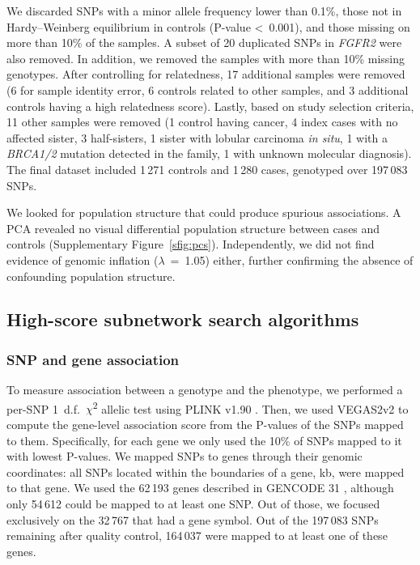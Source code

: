 \documentclass[twocolumn, 11pt]{article}
\begin{document}
We discarded SNPs with a minor allele frequency lower than 0.1\%, those not in Hardy--Weinberg equilibrium in controls (P-value \textless~0.001), and those missing on more than 10\% of the samples. A subset of 20 duplicated SNPs in \emph{FGFR2} were also removed. In addition, we removed the samples with more than 10\% missing genotypes. After controlling for relatedness, 17 additional samples were removed (6 for sample identity error, 6 controls related to other samples, and 3 additional controls having a high relatedness score). Lastly, based on study selection criteria, 11 other samples were removed (1 control having cancer, 4 index cases with no affected sister, 3 half-sisters, 1 sister with lobular carcinoma \emph{in situ}, 1 with a \emph{BRCA1/2} mutation detected in the family, 1 with unknown molecular diagnosis). The final dataset included 1\,271 controls and 1\,280 cases, genotyped over 197\,083 SNPs. 

We looked for population structure that could produce spurious associations. A PCA revealed no visual differential population structure between cases and controls (Supplementary Figure~\ref{sfig:pcs}). Independently, we did not find evidence of genomic inflation (\(\lambda\)~=~1.05) either, further confirming the absence of confounding population structure.

\subsection{High-score subnetwork search algorithms}
\subsubsection{SNP and gene association}
\label{methods:node_score}
To measure association between a genotype and the phenotype, we performed a per-SNP 1~d.f.~\(\chi\)\textsuperscript{2} allelic test using PLINK v1.90 \cite{chang_second-generation_2015}. Then, we used VEGAS2v2 \cite{mishra_vegas2:_2015} to compute the gene-level association score from the P-values of the SNPs mapped to them. Specifically, for each gene we only used the 10\% of SNPs mapped to it with lowest P-values. We mapped SNPs to genes through their genomic coordinates: all SNPs located within the boundaries of a gene,  kb, were mapped to that gene. We used the 62\,193 genes described in GENCODE 31 \cite{frankish_gencode_2019}, although only 54\,612 could be mapped to at least one SNP. Out of those, we focused exclusively on the 32\,767 that had a gene symbol. Out of the 197\,083 SNPs remaining after quality control, 164\,037 were mapped to at least one of these genes. 
\end{document}
